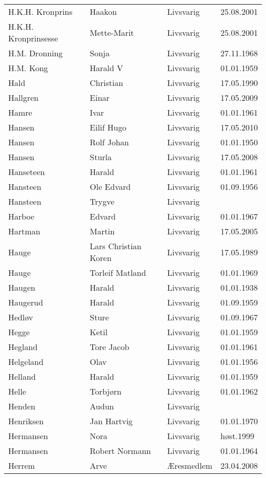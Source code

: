 \begin{longtable}{llll}
H.K.H. Kronprins	&	Haakon 	&	Livsvarig	&	25.08.2001	\\
H.K.H. Kronprinsesse	&	Mette-Marit 	&	Livsvarig	&	25.08.2001	\\
H.M. Dronning	&	Sonja	&	Livsvarig 	&	27.11.1968	\\
H.M. Kong	&	Harald V	&	Livsvarig 	&	01.01.1959	\\
Hald	&	Christian	&	Livsvarig 	&	17.05.1990	\\
Hallgren	&	Einar	&	Livsvarig	&	17.05.2009	\\
Hamre	&	Ivar	&	Livsvarig 	&	01.01.1961	\\
Hansen	&	Eilif Hugo	&	Livsvarig	&	17.05.2010	\\
Hansen	&	Rolf Johan	&	Livsvarig 	&	01.01.1950	\\
Hansen	&	Sturla	&	Livsvarig	&	17.05.2008	\\
Hanseteen	&	Harald	&	Livsvarig 	&	01.01.1961	\\
Hansteen	&	Ole Edvard	&	Livsvarig 	&	01.09.1956	\\
Hansteen	&	Trygve	&	Livsvarig 	&		\\
Harboe	&	Edvard	&	Livsvarig 	&	01.01.1967	\\
Hartman 	&	Martin	&	Livsvarig	&	17.05.2005	\\
Hauge	&	Lars Christian Koren	&	Livsvarig 	&	17.05.1989	\\
Hauge	&	Torleif Matland	&	Livsvarig 	&	01.01.1969	\\
Haugen	&	Harald	&	Livsvarig 	&	01.01.1938	\\
Haugerud	&	Harald	&	Livsvarig 	&	01.09.1959	\\
Hedløv	&	Sture	&	Livsvarig 	&	01.09.1967	\\
Hegge	&	Ketil	&	Livsvarig 	&	01.01.1959	\\
Hegland	&	Tore Jacob	&	Livsvarig 	&	01.01.1961	\\
Helgeland	&	Olav	&	Livsvarig 	&	01.01.1956	\\
Helland	&	Harald	&	Livsvarig 	&	01.01.1959	\\
Helle	&	Torbjørn	&	Livsvarig 	&	01.01.1962	\\
Henden	&	Audun	&	Livsvarig 	&		\\
Henriksen	&	Jan Hartvig	&	Livsvarig 	&	01.01.1970	\\
Hermansen	&	Nora	&	Livsvarig	&	høst.1999	\\
Hermansen	&	Robert Normann	&	Livsvarig 	&	01.01.1964	\\
Herrem	&	Arve	&	Æresmedlem	&	23.04.2008	\\

\end{longtable}

